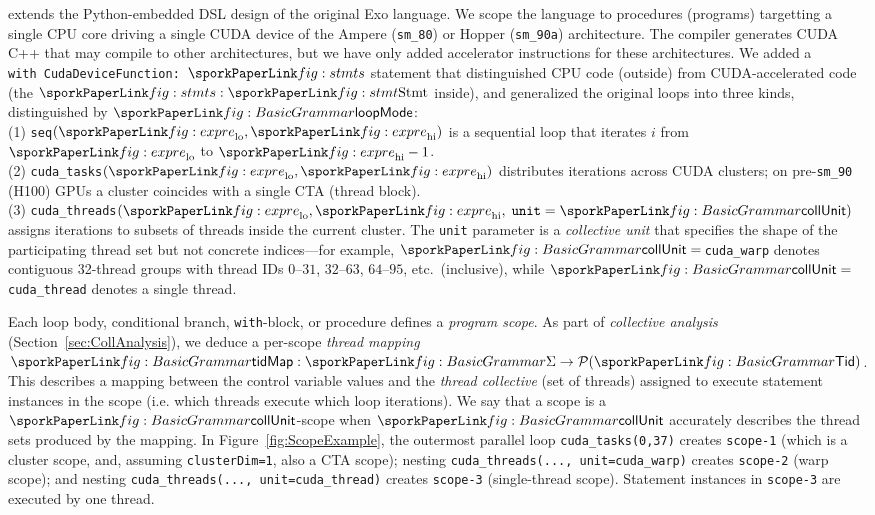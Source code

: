 
\sporkName{} extends the Python-embedded DSL design of the original Exo language.
We scope the language to procedures (programs) targetting a single CPU core driving a single CUDA device of the Ampere (\texttt{sm\_80}) or Hopper (\texttt{sm\_90a}) architecture.
The \sporkName{} compiler generates CUDA C++ that may compile to other architectures, but we have only added accelerator instructions for these architectures.
We added a \texttt{with~CudaDeviceFunction: $\sporks$} statement that distinguished CPU code (outside) from CUDA-accelerated code (the $\sporks:\sporkStmt$ inside),
and generalized the original loops into three kinds, distinguished by $\sporkloopMode$: \\
(1) \texttt{seq}$(\sporkexpr_\mathrm{lo},\sporkexpr_\mathrm{hi})$ is a sequential loop that iterates $i$ from $\sporkexpr_\mathrm{lo}$ to $\sporkexpr_\mathrm{hi}-1$.\\
(2) \texttt{cuda\_tasks}$(\sporkexpr_\mathrm{lo},\sporkexpr_\mathrm{hi})$ distributes iterations across CUDA clusters; on pre-\texttt{sm\_90} (H100) GPUs a cluster coincides with a single CTA (thread block).\\
(3) \texttt{cuda\_threads}$(\sporkexpr_\mathrm{lo},\sporkexpr_\mathrm{hi},\; \texttt{unit}=\sporkcollUnit)$ assigns iterations to subsets of threads inside the current cluster. %
The \texttt{unit} parameter is a \emph{collective unit} that specifies the shape of the participating thread set but not concrete indices—for example, $\sporkcollUnit=\,$\texttt{cuda\_warp} denotes contiguous 32-thread groups with thread IDs \(0\text{--}31\), \(32\text{--}63\), \(64\text{--}95\), etc.\ (inclusive), while $\sporkcollUnit=\,$\texttt{cuda\_thread} denotes a single thread.  %



Each loop body, conditional branch, \texttt{with}-block, or procedure defines a \emph{program scope}.
As part of \emph{collective analysis} (Section~\ref{sec:CollAnalysis}), we deduce a per-scope \emph{thread mapping} $\sporktidMap: \sporkSigma \to \mathcal{P}(\sporkTid)$.
This describes a mapping between the control variable values and the \emph{thread collective} (set of threads) assigned to execute statement instances in the scope (i.e. which threads execute which loop iterations).
We say that a scope is a $\sporkcollUnit$-scope when $\sporkcollUnit$ accurately describes the thread sets produced by the mapping.
In Figure~\ref{fig:ScopeExample}, the outermost parallel loop \texttt{cuda\_tasks(0,37)} creates \texttt{scope-1} (which is a cluster scope, and, assuming \texttt{clusterDim=1}, also a CTA scope); nesting \texttt{cuda\_threads(..., unit=\texttt{cuda\_warp})} creates \texttt{scope-2} (warp scope); and nesting \texttt{cuda\_threads(..., unit=\texttt{cuda\_thread})} creates \texttt{scope-3} (single-thread scope).
Statement instances in \texttt{scope-3} are executed by one thread.

